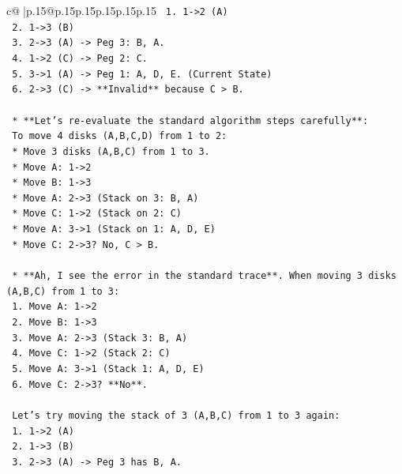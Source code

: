 \documentclass{article}
\begin{document}
{\begin{supertabular}{c@{$\;$}|p{.15\linewidth}@{}p{.15\linewidth}p{.15\linewidth}p{.15\linewidth}p{.15\linewidth}p{.15\linewidth}}
{{{\texttt{        1. 1{-}>2 (A)} \\
\texttt{        2. 1{-}>3 (B)} \\
\texttt{        3. 2{-}>3 (A) {-}> Peg 3: B, A.} \\
\texttt{        4. 1{-}>2 (C) {-}> Peg 2: C.} \\
\texttt{        5. 3{-}>1 (A) {-}> Peg 1: A, D, E. (Current State)} \\
\texttt{        6. 2{-}>3 (C) {-}> **Invalid** because C > B.} \\
\\ 
\texttt{    *   **Let's re{-}evaluate the standard algorithm steps carefully**:} \\
\texttt{        To move 4 disks (A,B,C,D) from 1 to 2:} \\
\texttt{        *   Move 3 disks (A,B,C) from 1 to 3.} \\
\texttt{            *   Move A: 1{-}>2} \\
\texttt{            *   Move B: 1{-}>3} \\
\texttt{            *   Move A: 2{-}>3 (Stack on 3: B, A)} \\
\texttt{            *   Move C: 1{-}>2 (Stack on 2: C)} \\
\texttt{            *   Move A: 3{-}>1 (Stack on 1: A, D, E)} \\
\texttt{            *   Move C: 2{-}>3? No, C > B.} \\
\\ 
\texttt{    *   **Ah, I see the error in the standard trace**. When moving 3 disks (A,B,C) from 1 to 3:} \\
\texttt{        1. Move A: 1{-}>2} \\
\texttt{        2. Move B: 1{-}>3} \\
\texttt{        3. Move A: 2{-}>3 (Stack 3: B, A)} \\
\texttt{        4. Move C: 1{-}>2 (Stack 2: C)} \\
\texttt{        5. Move A: 3{-}>1 (Stack 1: A, D, E)} \\
\texttt{        6. Move C: 2{-}>3? **No**.} \\
\\ 
\texttt{        Let's try moving the stack of 3 (A,B,C) from 1 to 3 again:} \\
\texttt{        1. 1{-}>2 (A)} \\
\texttt{        2. 1{-}>3 (B)} \\
\texttt{        3. 2{-}>3 (A) {-}> Peg 3 has B, A.} \\
}}}
\end{supertabular}}
\end{document}

